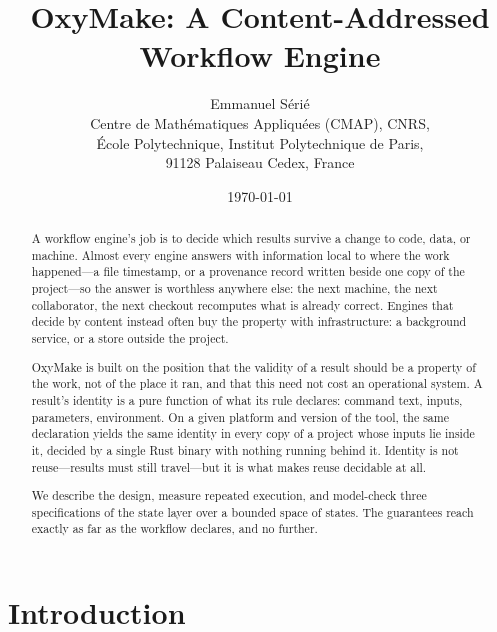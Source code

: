 \documentclass[12pt,a4paper]{article}
\title{OxyMake: A Content-Addressed Workflow Engine}
\author{Emmanuel Sérié\\
\small Centre de Mathématiques Appliquées (CMAP), CNRS,\\
\small École Polytechnique, Institut Polytechnique de Paris,\\
\small 91128 Palaiseau Cedex, France}
\date{\today}
\begin{document}
\maketitle

\begin{abstract}
A workflow engine's job is to decide which results survive a change to
code, data, or machine. Almost every engine answers with information
local to where the work happened---a file timestamp, or a provenance
record written beside one copy of the project---so the answer is
worthless anywhere else: the next machine, the next collaborator, the
next checkout recomputes what is already correct. Engines that decide by
content instead often buy the property with infrastructure: a
background service, or a store outside the project.

OxyMake is built on the position that the validity of a result should be
a property of the work, not of the place it ran, and that this need not
cost an operational system. A result's identity is a pure function of
what its rule declares: command text, inputs, parameters, environment.
On a given platform and version of the tool, the same declaration yields
the same identity in every copy of a project whose inputs lie inside it,
decided by a single Rust binary with nothing running behind it. Identity is not reuse---results
must still travel---but it is what makes reuse decidable at all.

We describe the design, measure repeated execution, and model-check
three specifications of the state layer over a bounded space of states.
The guarantees reach exactly as far as the workflow declares, and no
further.
\end{abstract}

\section{Introduction}
\label{sec:introduction}
\end{document}
